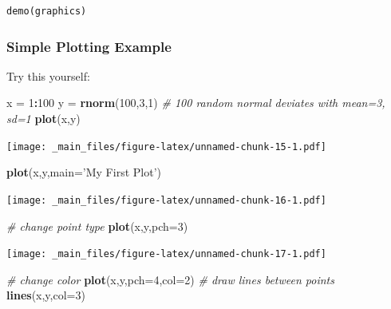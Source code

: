 \documentclass[]{article}
\newenvironment{Shaded}{\begin{snugshade}}{\end{snugshade}}
\newcommand{\KeywordTok}[1]{\textcolor[rgb]{0.13,0.29,0.53}{\textbf{#1}}}
\newcommand{\DataTypeTok}[1]{\textcolor[rgb]{0.13,0.29,0.53}{#1}}
\newcommand{\DecValTok}[1]{\textcolor[rgb]{0.00,0.00,0.81}{#1}}
\newcommand{\StringTok}[1]{\textcolor[rgb]{0.31,0.60,0.02}{#1}}
\newcommand{\CommentTok}[1]{\textcolor[rgb]{0.56,0.35,0.01}{\textit{#1}}}
\newcommand{\OperatorTok}[1]{\textcolor[rgb]{0.81,0.36,0.00}{\textbf{#1}}}
\newcommand{\NormalTok}[1]{#1}
\theoremstyle{definition}
\theoremstyle{definition}
\theoremstyle{remark}
\begin{document}
\begin{verbatim}
demo(graphics)
\end{verbatim}

\subsubsection{Simple Plotting Example}\label{simple-plotting-example}

Try this yourself:

\begin{Shaded}
\begin{Highlighting}[]
\NormalTok{    x =}\StringTok{ }\DecValTok{1}\OperatorTok{:}\DecValTok{100}
\NormalTok{    y =}\StringTok{ }\KeywordTok{rnorm}\NormalTok{(}\DecValTok{100}\NormalTok{,}\DecValTok{3}\NormalTok{,}\DecValTok{1}\NormalTok{) }\CommentTok{# 100 random normal deviates with mean=3, sd=1}
    \KeywordTok{plot}\NormalTok{(x,y)}
\end{Highlighting}
\end{Shaded}

\texttt{[image: \_main\_files/figure-latex/unnamed-chunk-15-1.pdf]}

\begin{Shaded}
\begin{Highlighting}[]
    \KeywordTok{plot}\NormalTok{(x,y,}\DataTypeTok{main=}\StringTok{'My First Plot'}\NormalTok{)}
\end{Highlighting}
\end{Shaded}

\texttt{[image: \_main\_files/figure-latex/unnamed-chunk-16-1.pdf]}

\begin{Shaded}
\begin{Highlighting}[]
    \CommentTok{# change point type}
    \KeywordTok{plot}\NormalTok{(x,y,}\DataTypeTok{pch=}\DecValTok{3}\NormalTok{)}
\end{Highlighting}
\end{Shaded}

\texttt{[image: \_main\_files/figure-latex/unnamed-chunk-17-1.pdf]}

\begin{Shaded}
\begin{Highlighting}[]
    \CommentTok{# change color}
    \KeywordTok{plot}\NormalTok{(x,y,}\DataTypeTok{pch=}\DecValTok{4}\NormalTok{,}\DataTypeTok{col=}\DecValTok{2}\NormalTok{)}
    \CommentTok{# draw lines between points}
    \KeywordTok{lines}\NormalTok{(x,y,}\DataTypeTok{col=}\DecValTok{3}\NormalTok{)}
\end{Highlighting}
\end{Shaded}
\end{document}

